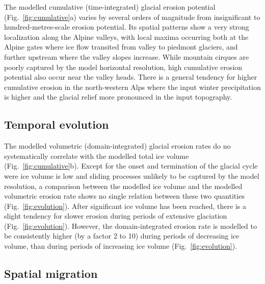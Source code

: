 \documentclass[utf8]{article}
\begin{document}
    The modelled cumulative (time-integrated) glacial erosion potential
    (Fig.~\ref{fig:cumulative}a) varies by several orders of magnitude
    from insignificant to hundred-metres-scale erosion potential. Its spatial
    patterns show a very strong localization along the Alpine valleys, with
    local maxima occurring both at
    the Alpine gates where ice flow transited from valley to piedmont glaciers,
    and further upstream where the valley slopes increase. While mountain
    cirques are poorly captured by the model horizontal resolution, high
    cumulative erosion potential also occur near the valley heads.
    There is a general tendency for higher cumulative erosion in the
    north-western Alps where the input winter precipitation
    \citep[WorldClim,][Fig.~1h]{Seguinot.etal.2018} is higher and the
    glacial relief more pronounced in the input topography.

\subsection{Temporal evolution}

    The modelled volumetric (domain-integrated) glacial erosion rates
    do no systematically correlate with the modelled total ice volume
    (Fig.~\ref{fig:cumulative}b). Except for the onset and termination of the
    glacial cycle were ice volume is low and sliding processes unlikely to be
    captured by the model resolution, a comparison between the modelled ice
    volume and the modelled volumetric erosion rate shows no single relation
    between these two quantities (Fig.~\ref{fig:evolution}). After significant
    ice volume has been reached, there is a slight tendency for slower erosion
    during periods of extensive glaciation (Fig.~\ref{fig:evolution}). However,
    the domain-integrated erosion rate is modelled to be consistently higher
    (by a factor 2 to 10) during periods of decreasing ice volume, than during
    periods of increasing ice volume (Fig.~\ref{fig:evolution}).

\subsection{Spatial migration}
\end{document}
